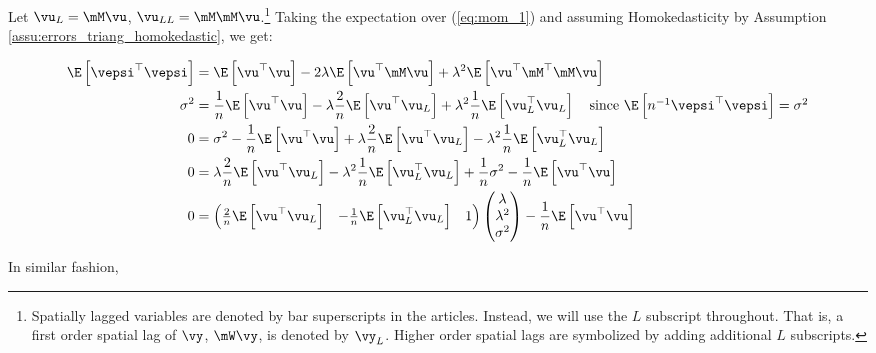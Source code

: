 \documentclass[english,12pt]{book}\usepackage[]{graphicx}\usepackage[]{xcolor}
\begin{document}
Let $\vu_L = \mM\vu$, $\vu_{LL} = \mM\mM\vu$.\footnote{Spatially lagged variables are denoted by bar superscripts in the articles. Instead, we will use the $L$ subscript throughout. That is, a first order spatial lag of $\vy$, $\mW\vy$, is denoted by $\vy_L$. Higher order spatial lags are symbolized by adding additional $L$ subscripts.
} Taking the expectation over (\ref{eq:mom_1}) and assuming Homokedasticity by Assumption \ref{assu:errors_triang_homokedastic}, we get:


\begin{equation}\label{eq:Pequation_1_gmm}
  \begin{aligned}
      \E\left[\vepsi^\top \vepsi\right] & = \E\left[\vu^\top\vu\right] - 2\lambda\E\left[\vu^\top\mM\vu\right] + \lambda^2\E\left[\vu^\top\mM^\top\mM\vu\right] \\
       \sigma^2& = \frac{1}{n}\E\left[\vu^\top\vu\right] - \lambda \frac{2}{n}\E\left[\vu^\top\vu_L\right] + \lambda^2\frac{1}{n}\E\left[\vu_L^\top\vu_L\right] \quad \mbox{since $\E\left[n^{-1}\vepsi^\top \vepsi\right] = \sigma^2$}\\
       0 &= \sigma^2  - \frac{1}{n}\E\left[\vu^\top\vu\right] + \lambda \frac{2}{n}\E\left[\vu^\top\vu_L\right] - \lambda^2\frac{1}{n}\E\left[\vu_L^\top\vu_L\right]\\
       0 &= \lambda \frac{2}{n}\E\left[\vu^\top\vu_L\right] - \lambda^2\frac{1}{n}\E\left[\vu_L^\top\vu_L\right] + \frac{1}{n}\sigma^2 - \frac{1}{n}\E\left[\vu^\top\vu\right] \\
       0 & =  \begin{pmatrix}
         \frac{2}{n}\E\left[\vu^\top\vu_L\right] & - \frac{1}{n}\E\left[\vu_L^\top\vu_L\right] &  1
            \end{pmatrix}
            \begin{pmatrix}
              \lambda \\
              \lambda^2 \\
              \sigma^2
            \end{pmatrix} - \frac{1}{n}\E\left[\vu^\top\vu\right]
  \end{aligned}
\end{equation}

In similar fashion,
\end{document}
